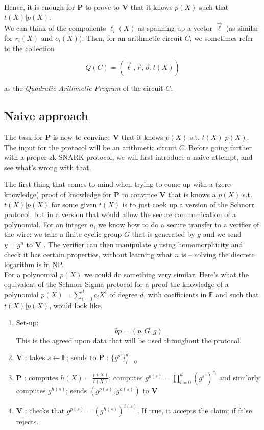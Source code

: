 \documentclass[11pt,oneside]{article}
\newcommand{\be}{\begin{equation}}
\newcommand{\ee}{\end{equation}}
\newcommand{\bP}{\textbf{P} }
\newcommand{\bV}{\textbf{V} }
\theoremstyle{definition}
\theoremstyle{remark}
\numberwithin{equation}{section}
\begin{document}
Hence, it is enough for \bP to prove to \bV that it knows $p(X)$ such that
$t(X)|p(X)$.\\ We can think of the components $\ell_i(X)$ as spanning up a
vector $\vec{\ell}$ (as similar for $r_i(X)$ and $o_i(X)$). Then, for an
arithmetic circuit $C$, we sometimes refer to the collection 

\be
Q(C)=\left(\vec{\ell},\vec{r},\vec{o},t(X)\right)
\ee 

as the \emph{Quadratic Arithmetic Program} of the circuit $C$.

\subsection{Naive approach}\label{sec:circuits:protocol}

The task for \bP is now to convince \bV that it knows $p(X)$ s.t. $t(X)|p(X)$.
The input for the protocol will be an arithmetic circuit $C$. Before going
further with a proper zk-SNARK protocol, we will first introduce a naive
attempt, and see what's wrong with that.

The first thing that comes to mind when trying to come up with a
(zero-knowledge) proof of knowledge for \bP to convince \bV that is knows a
$p(X)$ s.t. $t(X)|p(X)$ for some given $t(X)$ is to just cook up a version of
the \hyperlink{box:schnorr}{Schnorr protocol}, but in a version that would allow
the secure communication of a polynomial. For an integer $n$, we know how to do
a secure transfer to a verifier of the wire: we take a finite cyclic group $G$
that is generated by $g$ and we send $y=g^n$ to \bV. The verifier can then
manipulate $y$ using homomorphicity and check it has certain properties, without
learning what $n$ is -- solving the discrete logarithm is in NP.\\

For a polynomial $p(X)$ we could do something very similar. Here's what the
equivalent of the Schnorr Sigma protocol for a proof the knowledge of a
polynomial $p(X)=\sum_{i=0}^{d}c_iX^i$ of degree $d$, with coefficients in
$\mathbb{F}$ and such that $t(X)|p(X)$, would look like.

\begin{enumerate}
	\item Set-up: \be bp = (p,G,g) \ee
	This is the agreed upon data that will be used throughout the protocol.
	\item \bV: takes $s\leftarrow\mathbb{F}$; sends to \bP: $\{g^{s^i}\}_{i=0}^{d}$
  \item \bP: computes $h(X)=\frac{p(X)}{t(X)}$; computes
    $g^{p(s)}=\prod\limits_{i=0}^d\left(g^{s^i}\right)^{c_i}$ and similarly
    computes $g^{h(s)}$; sends $(g^{p(s)},g^{h(s)})$ to \bV
	\item \bV: checks that $g^{p(s)}=\left(g^{h(s)}\right)^{t(s)}$. If true, it accepts the claim; if false rejects.
\end{enumerate}
\end{document}

